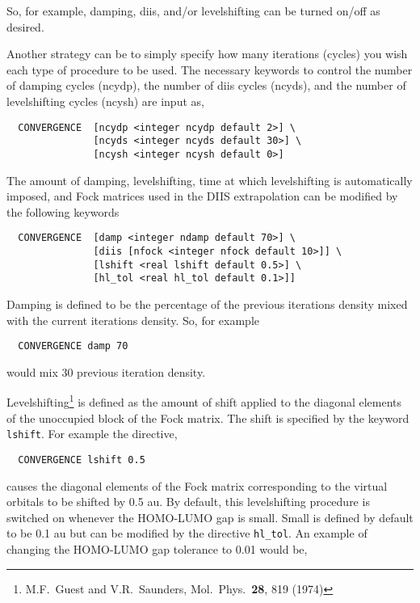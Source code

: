 So, for example, damping, diis, and/or levelshifting can be turned
on/off as desired.

Another strategy can be to simply specify how many iterations (cycles) you wish
each type of procedure to be used.  The necessary keywords to control
the number of damping cycles (ncydp), the number of diis cycles
(ncyds), and the number of levelshifting cycles (ncysh) are input as,

\begin{verbatim}
  CONVERGENCE  [ncydp <integer ncydp default 2>] \
               [ncyds <integer ncyds default 30>] \
               [ncysh <integer ncysh default 0>]
\end{verbatim}

The amount of damping, levelshifting, time at which levelshifting is
automatically imposed, and Fock matrices used in the DIIS
extrapolation can be modified by the following keywords

\begin{verbatim}
  CONVERGENCE  [damp <integer ndamp default 70>] \
               [diis [nfock <integer nfock default 10>]] \
               [lshift <real lshift default 0.5>] \
               [hl_tol <real hl_tol default 0.1>]]
\end{verbatim}

Damping is defined to be the percentage of the previous iterations
density mixed with the current iterations density.  So, for example 

\begin{verbatim}
  CONVERGENCE damp 70
\end{verbatim}

would mix 30%
previous iteration density.

Levelshifting\footnote {M.F.~Guest and 
V.R.~Saunders, Mol.~Phys.~{\bf 28}, 819 (1974)} is defined as the
amount of shift applied to the diagonal elements of the unoccupied
block of the Fock matrix.  The shift is specified by the
keyword \verb+lshift+.  For example the directive,

\begin{verbatim}
  CONVERGENCE lshift 0.5
\end{verbatim}

causes the diagonal elements of the Fock matrix
corresponding to the virtual orbitals to be shifted by 0.5 au.
By default, this levelshifting procedure is switched on whenever the
HOMO-LUMO gap is small.  Small is defined by default to be 0.1 au but
can be modified by the directive \verb+hl_tol+.  An example of
changing the HOMO-LUMO gap tolerance to 0.01 would be,

